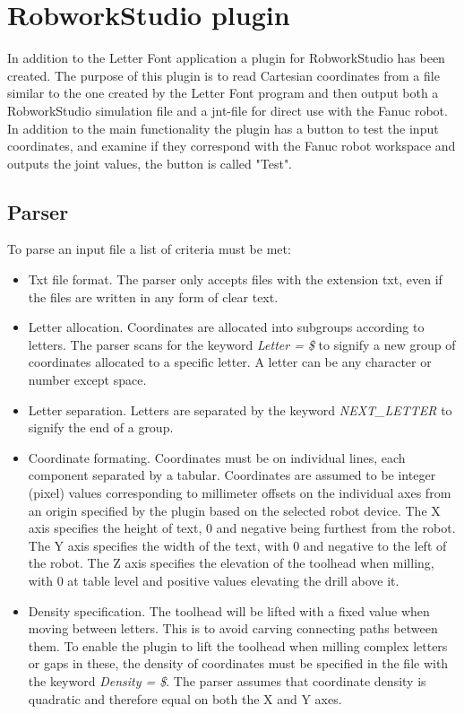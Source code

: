 \section{RobworkStudio plugin}
\label{sec:plugin}
In addition to the Letter Font application a plugin for RobworkStudio has been created. The purpose of this plugin is to read Cartesian coordinates from a file similar to the one created by the Letter Font program and then output both a RobworkStudio simulation file and a jnt-file for direct use with the Fanuc robot. In addition to the main functionality the plugin has a button to test the input coordinates, and examine if they correspond with the Fanuc robot workspace and outputs the joint values, the button is called "Test".

\subsection{Parser}
\label{sec:parser}
To parse an input file a list of criteria must be met:
\begin{itemize}
	\item Txt file format. The parser only accepts files with the extension txt, even if the files are written in any form of clear text. 
	\item Letter allocation. Coordinates are allocated into subgroups according to letters. The parser scans for the keyword \textit{Letter = \$} to signify a new group of coordinates allocated to a specific letter. A letter can be any character or number except space.
	\item Letter separation. Letters are separated by the keyword \textit{NEXT\_LETTER} to signify the end of a group.
	\item Coordinate formating. Coordinates must be on individual lines, each component separated by a tabular. Coordinates are assumed to be integer (pixel) values corresponding to millimeter offsets on the individual axes from an origin specified by the plugin based on the selected robot device. The X axis specifies the height of text, 0 and negative being furthest from the robot. The Y axis specifies the width of the text, with 0 and negative to the left of the robot. The Z axis specifies the elevation of the toolhead when milling, with 0 at table level and positive values elevating the drill above it.
	\item Density specification. The toolhead will be lifted with a fixed value when moving between letters. This is to avoid carving connecting paths between them. To enable the plugin to lift the toolhead when milling complex letters or gaps in these, the density of coordinates must be specified in the file with the keyword \textit{Density = \$}. The parser assumes that coordinate density is quadratic and therefore equal on both the X and Y axes.
\end{itemize}

